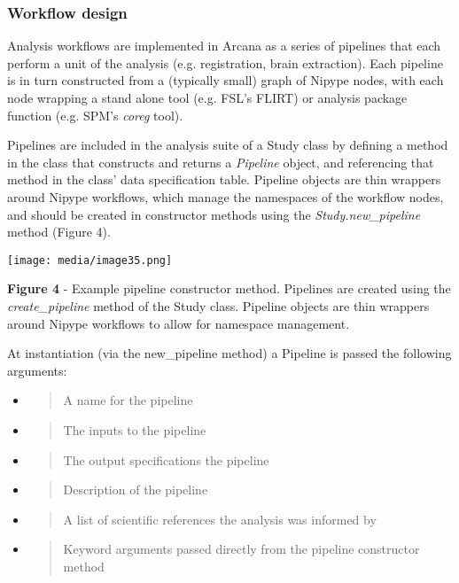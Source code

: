 \hypertarget{workflow-design}{%
\subsubsection{Workflow design}\label{workflow-design}}

Analysis workflows are implemented in Arcana as a series of pipelines
that each perform a unit of the analysis (e.g. registration, brain
extraction). Each pipeline is in turn constructed from a (typically
small) graph of Nipype nodes, with each node wrapping a stand alone tool
(e.g. FSL's FLIRT) or analysis package function (e.g. SPM's \emph{coreg}
tool).

Pipelines are included in the analysis suite of a Study class by
defining a method in the class that constructs and returns a
\emph{Pipeline} object, and referencing that method in the class' data
specification table. Pipeline objects are thin wrappers around Nipype
workflows, which manage the namespaces of the workflow nodes, and should
be created in constructor methods using the \emph{Study.new\_pipeline}
method (Figure 4).

\texttt{[image: media/image35.png]}

\textbf{Figure 4} - Example pipeline constructor method. Pipelines are
created using the \emph{create\_pipeline} method of the Study class.
Pipeline objects are thin wrappers around Nipype workflows to allow for
namespace management.

At instantiation (via the new\_pipeline method) a Pipeline is passed the
following arguments:

\begin{itemize}
\item
  \begin{quote}
  A name for the pipeline
  \end{quote}
\item
  \begin{quote}
  The inputs to the pipeline
  \end{quote}
\item
  \begin{quote}
  The output specifications the pipeline
  \end{quote}
\item
  \begin{quote}
  Description of the pipeline
  \end{quote}
\item
  \begin{quote}
  A list of scientific references the analysis was informed by
  \end{quote}
\item
  \begin{quote}
  Keyword arguments passed directly from the pipeline constructor method
  \end{quote}
\end{itemize}

